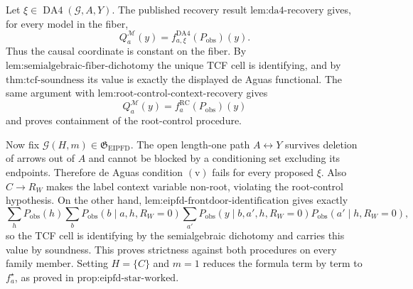 Let \(\xi\in\operatorname{DA4}(\mathcal G,A,Y)\). The published recovery result \(\text{lem:da4-recovery}\) gives, for every model in the fiber,
\[
Q_a^{\mathcal M}(y)=f^{\mathrm{DA4}}_{a,\xi}(P_{\mathrm{obs}})(y).
\]
Thus the causal coordinate is constant on the fiber. By \(\text{lem:semialgebraic-fiber-dichotomy}\) the unique TCF cell is identifying, and by \(\text{thm:tcf-soundness}\) its value is exactly the displayed de Aguas functional. The same argument with \(\text{lem:root-control-context-recovery}\) gives
\[
Q_a^{\mathcal M}(y)=f_a^{\mathrm{RC}}(P_{\mathrm{obs}})(y)
\]
and proves containment of the root-control procedure.

Now fix \(\mathcal G(H,m)\in\mathfrak G_{\mathrm{EIPFD}}\). The open length-one path \(A\leftrightarrow Y\) survives deletion of arrows out of \(A\) and cannot be blocked by a conditioning set excluding its endpoints. Therefore de Aguas condition \(\mathrm{(v)}\) fails for every proposed \(\xi\). Also \(C\to R_W\) makes the label context variable non-root, violating the root-control hypothesis. On the other hand, \(\text{lem:eipfd-frontdoor-identification}\) gives exactly
\[
\sum_hP_{\mathrm{obs}}(h)
\sum_bP_{\mathrm{obs}}(b\mid a,h,R_W=0)
\sum_{a'}P_{\mathrm{obs}}(y\mid b,a',h,R_W=0)
P_{\mathrm{obs}}(a'\mid h,R_W=0),
\]
so the TCF cell is identifying by the semialgebraic dichotomy and carries this value by soundness. This proves strictness against both procedures on every family member. Setting \(H=\{C\}\) and \(m=1\) reduces the formula term by term to \(f_a^\star\), as proved in \(\text{prop:eipfd-star-worked}\).